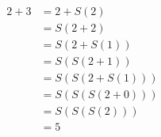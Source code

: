 \documentclass[preview]{standalone}
\begin{document}
\begin{align*}
2 + 3 &= 2 + S(2) \\ &= S(2 + 2) \\ &= S(2 + S(1)) \\ &= S(S(2 + 1)) \\ &= S(S(2 + S(1))) \\ &= S(S(S(2 + 0))) \\ &= S(S(S(2))) \\ &= 5
\end{align*}
\end{document}
